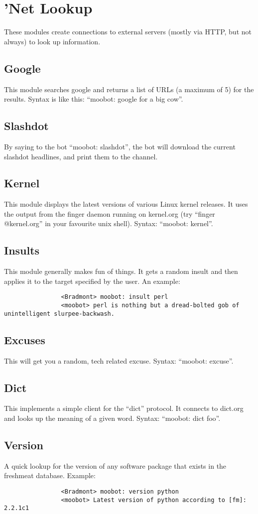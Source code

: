 \documentclass[titlepage]{article}
\begin{document}
	\section{'Net Lookup}
		These modules create connections to external servers 
		(mostly via HTTP, but not always) to look up information.
		\subsection{Google}
			This module searches google and returns a list of URLs
			(a maximum of 5) for the results.  Syntax is like this:
			``moobot:  google for a big cow''.
		\subsection{Slashdot}
			By saying to the bot ``moobot: slashdot'', the bot will
			download the current slashdot headlines, and print them to
			the channel.
		\subsection{Kernel}
			This module displays the latest versions of various Linux
			kernel releases.  It uses the output from the finger daemon
			running on kernel.org (try ``finger @kernel.org'' in your
			favourite unix shell).  Syntax:  ``moobot: kernel''.
		\subsection{Insults}
			This module generally makes fun of things.  It gets a random
			insult and then applies it to the target specified by the
			user.  An example:
			\begin{verbatim}
				<Bradmont> moobot: insult perl
				<moobot> perl is nothing but a dread-bolted gob of unintelligent slurpee-backwash.
			\end{verbatim}
		\subsection{Excuses}
			This will get you a random, tech related excuse.  Syntax:
			``moobot: excuse''.
		\subsection{Dict}
			This implements a simple client for the ``dict'' protocol.  It
			connects to dict.org and looks up the meaning of a given word.
			Syntax:  ``moobot: dict foo''.
		\subsection{Version}
			A quick lookup for the version of any software package that
			exists in the freshmeat database.  Example:
			\begin{verbatim}
				<Bradmont> moobot: version python
				<moobot> Latest version of python according to [fm]: 2.2.1c1
			\end{verbatim}
\end{document}
